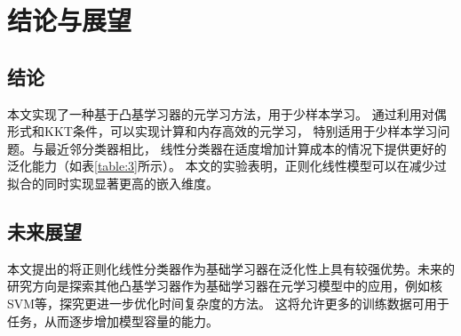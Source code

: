 \vspace*{6pt}

\endgroup
\begingroup
\let\clearpage\relax

\chapter{结论与展望}

\section{结论}
本文实现了一种基于凸基学习器的元学习方法，用于少样本学习。
通过利用对偶形式和KKT条件，可以实现计算和内存高效的元学习，
特别适用于少样本学习问题。与最近邻分类器相比，
线性分类器在适度增加计算成本的情况下提供更好的泛化能力（如表\ref{table:3}所示）。
本文的实验表明，正则化线性模型可以在减少过拟合的同时实现显著更高的嵌入维度。
\section{未来展望}
本文提出的将正则化线性分类器作为基础学习器在泛化性上具有较强优势。未来的研究方向是探索其他凸基学习器作为基础学习器在元学习模型中的应用，例如核SVM等，探究更进一步优化时间复杂度的方法。
这将允许更多的训练数据可用于任务，从而逐步增加模型容量的能力。
\endgroup